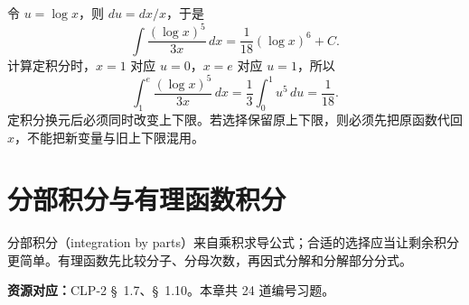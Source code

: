 \documentclass[UTF8,12pt,a4paper,fontset=fandol]{ctexart}
\begin{document}
\begin{solve}\label{ans:c12q24}
令 $u=\log x$，则 $du=dx/x$，于是
\[
\int\frac{(\log x)^{5}}{3x}\,dx=\frac{1}{18}(\log x)^{6}+C.
\]
计算定积分时，$x=1$ 对应 $u=0$，$x=e$ 对应 $u=1$，所以
\[
\int_1^e\frac{(\log x)^{5}}{3x}\,dx=\frac1{3}\int_0^1u^{5}\,du=\frac{1}{18}.
\]
定积分换元后必须同时改变上下限。若选择保留原上下限，则必须先把原函数代回 $x$，不能把新变量与旧上下限混用。
\end{solve}

\clearpage
\section{分部积分与有理函数积分}\label{sec:ch13}
分部积分（integration by parts）来自乘积求导公式；合适的选择应当让剩余积分更简单。有理函数先比较分子、分母次数，再因式分解和分解部分分式。

\textbf{资源对应：}CLP-2 \S~1.7、\S~1.10。本章共 24 道编号习题。
\end{document}
